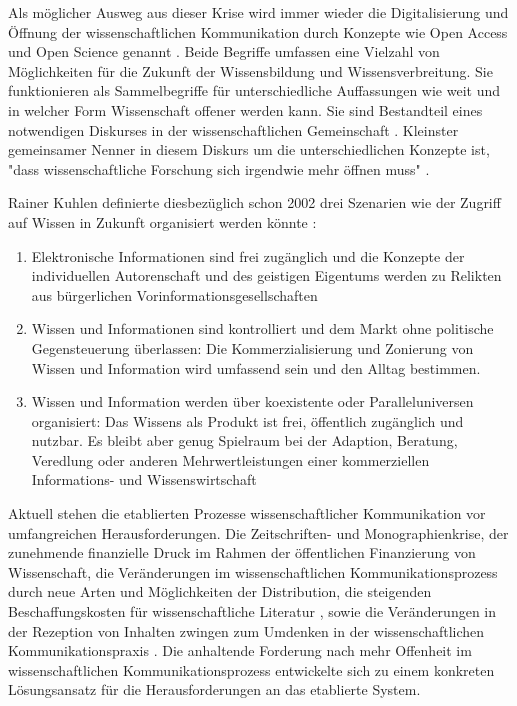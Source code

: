 Als möglicher Ausweg aus dieser Krise wird immer wieder die Digitalisierung und Öffnung der wissenschaftlichen Kommunikation durch Konzepte wie Open Access und Open Science genannt \cite{lewis_2015_future}. Beide Begriffe umfassen eine Vielzahl von Möglichkeiten für die Zukunft der Wissensbildung und Wissensverbreitung. Sie funktionieren als Sammelbegriffe für unterschiedliche Auffassungen wie weit und in welcher Form Wissenschaft offener werden kann. Sie sind Bestandteil eines notwendigen Diskurses in der wissenschaftlichen Gemeinschaft \cite{schulze_2013_open}. Kleinster gemeinsamer Nenner in diesem Diskurs um die unterschiedlichen Konzepte ist, "dass wissenschaftliche Forschung sich irgendwie mehr öffnen muss" \cite{cite:9}.

Rainer Kuhlen definierte diesbezüglich schon 2002 drei Szenarien wie der Zugriff auf Wissen in Zukunft organisiert werden könnte \cite{Kuhlen_2002_universalaccess}:
\begin{enumerate}
\item Elektronische Informationen sind frei zugänglich und die Konzepte der individuellen Autorenschaft und des geistigen Eigentums werden zu Relikten aus bürgerlichen Vorinformationsgesellschaften
\item Wissen und Informationen sind kontrolliert und dem Markt ohne politische Gegensteuerung überlassen: Die Kommerzialisierung und Zonierung von Wissen und Information wird umfassend sein und den Alltag bestimmen.
\item Wissen und Information werden über koexistente oder Paralleluniversen organisiert: Das Wissens als Produkt ist frei, öffentlich zugänglich und nutzbar. Es bleibt aber genug Spielraum bei der Adaption, Beratung, Veredlung oder anderen Mehrwertleistungen einer kommerziellen Informations- und Wissenswirtschaft
\end{enumerate}

Aktuell stehen die etablierten Prozesse wissenschaftlicher Kommunikation vor umfangreichen Herausforderungen. Die Zeitschriften- und Monographienkrise, der zunehmende finanzielle Druck im Rahmen der öffentlichen Finanzierung von Wissenschaft, die Veränderungen im wissenschaftlichen Kommunikationsprozess durch neue Arten und Möglichkeiten der Distribution, die steigenden Beschaffungskosten für wissenschaftliche Literatur \cite{cite:17} \cite{muller_2010_open}, sowie die Veränderungen in der Rezeption von Inhalten \cite{holub_2013_reception} zwingen zum Umdenken in der wissenschaftlichen Kommunikationspraxis \cite{suchen}. Die anhaltende Forderung nach mehr Offenheit im wissenschaftlichen Kommunikationsprozess entwickelte sich zu einem konkreten Lösungsansatz für die Herausforderungen an das etablierte System.


